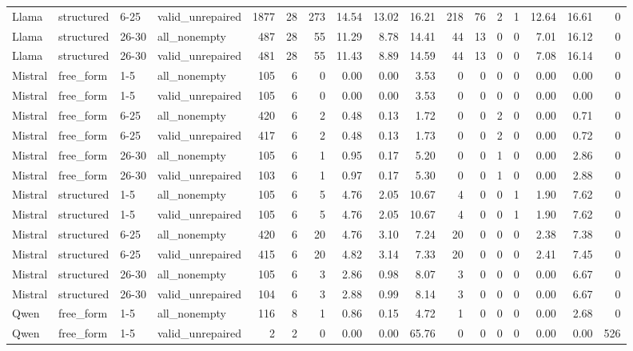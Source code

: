 \begin{longtable}{llllrrrrrrrrrrrrr}
Llama & structured & 6-25 & valid\_unrepaired & 1877 & 28 & 273 & 14.54 & 13.02 & 16.21 & 218 & 76 & 2 & 1 & 12.64 & 16.61 & 0 \\
Llama & structured & 26-30 & all\_nonempty & 487 & 28 & 55 & 11.29 & 8.78 & 14.41 & 44 & 13 & 0 & 0 & 7.01 & 16.12 & 0 \\
Llama & structured & 26-30 & valid\_unrepaired & 481 & 28 & 55 & 11.43 & 8.89 & 14.59 & 44 & 13 & 0 & 0 & 7.08 & 16.14 & 0 \\
Mistral & free\_form & 1-5 & all\_nonempty & 105 & 6 & 0 & 0.00 & 0.00 & 3.53 & 0 & 0 & 0 & 0 & 0.00 & 0.00 & 0 \\
Mistral & free\_form & 1-5 & valid\_unrepaired & 105 & 6 & 0 & 0.00 & 0.00 & 3.53 & 0 & 0 & 0 & 0 & 0.00 & 0.00 & 0 \\
Mistral & free\_form & 6-25 & all\_nonempty & 420 & 6 & 2 & 0.48 & 0.13 & 1.72 & 0 & 0 & 2 & 0 & 0.00 & 0.71 & 0 \\
Mistral & free\_form & 6-25 & valid\_unrepaired & 417 & 6 & 2 & 0.48 & 0.13 & 1.73 & 0 & 0 & 2 & 0 & 0.00 & 0.72 & 0 \\
Mistral & free\_form & 26-30 & all\_nonempty & 105 & 6 & 1 & 0.95 & 0.17 & 5.20 & 0 & 0 & 1 & 0 & 0.00 & 2.86 & 0 \\
Mistral & free\_form & 26-30 & valid\_unrepaired & 103 & 6 & 1 & 0.97 & 0.17 & 5.30 & 0 & 0 & 1 & 0 & 0.00 & 2.88 & 0 \\
Mistral & structured & 1-5 & all\_nonempty & 105 & 6 & 5 & 4.76 & 2.05 & 10.67 & 4 & 0 & 0 & 1 & 1.90 & 7.62 & 0 \\
Mistral & structured & 1-5 & valid\_unrepaired & 105 & 6 & 5 & 4.76 & 2.05 & 10.67 & 4 & 0 & 0 & 1 & 1.90 & 7.62 & 0 \\
Mistral & structured & 6-25 & all\_nonempty & 420 & 6 & 20 & 4.76 & 3.10 & 7.24 & 20 & 0 & 0 & 0 & 2.38 & 7.38 & 0 \\
Mistral & structured & 6-25 & valid\_unrepaired & 415 & 6 & 20 & 4.82 & 3.14 & 7.33 & 20 & 0 & 0 & 0 & 2.41 & 7.45 & 0 \\
Mistral & structured & 26-30 & all\_nonempty & 105 & 6 & 3 & 2.86 & 0.98 & 8.07 & 3 & 0 & 0 & 0 & 0.00 & 6.67 & 0 \\
Mistral & structured & 26-30 & valid\_unrepaired & 104 & 6 & 3 & 2.88 & 0.99 & 8.14 & 3 & 0 & 0 & 0 & 0.00 & 6.67 & 0 \\
Qwen & free\_form & 1-5 & all\_nonempty & 116 & 8 & 1 & 0.86 & 0.15 & 4.72 & 1 & 0 & 0 & 0 & 0.00 & 2.68 & 0 \\
Qwen & free\_form & 1-5 & valid\_unrepaired & 2 & 2 & 0 & 0.00 & 0.00 & 65.76 & 0 & 0 & 0 & 0 & 0.00 & 0.00 & 526 \\

\end{longtable}
